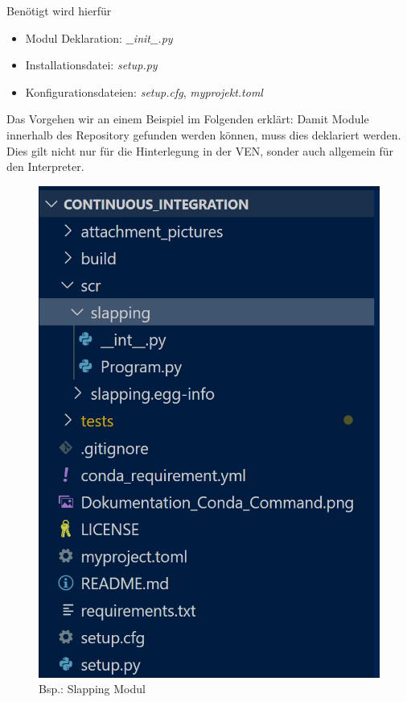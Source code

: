 Benötigt wird hierfür 
\begin{itemize}
	\item Modul Deklaration: \textit{$\_\_$init$\_\_$.py}
	\item Installationsdatei: \textit{setup.py}
	\item Konfigurationsdateien: \textit{setup.cfg}, \textit{myprojekt.toml}
\end{itemize}

Das Vorgehen wir an einem Beispiel im Folgenden erklärt:
Damit Module innerhalb des Repository gefunden werden können, muss dies deklariert werden. Dies gilt nicht nur für die Hinterlegung in der \gls{VEN}, sonder auch allgemein für den Interpreter.

\begin{figure}[H]
	\centering
	\includegraphics[scale = 0.8]{attachment/chapter_2/Scc070}
	\caption{Bsp.: Slapping Modul}
\end{figure}

